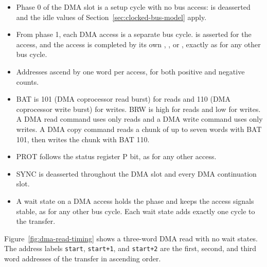 \begin{itemize}
	\item Phase 0 of the DMA slot is a setup cycle with no bus access:  is deasserted and the idle values of
	      Section~\ref{sec:clocked-bus-model} apply.
	\item From phase 1, each DMA access is a separate bus cycle.  is asserted for the access, and the access is
	      completed by its own , , or , exactly as for any other bus cycle.
	\item Addresses ascend by one word per access, for both positive and negative counts.
	\item BAT is 101 (DMA coprocessor read burst) for reads and 110 (DMA coprocessor write burst) for writes. BRW is high for
	      reads and low for writes. A DMA read command uses only reads and a DMA write command uses only writes. A DMA copy
	      command reads a chunk of up to seven words with BAT 101, then writes the chunk with BAT 110.
	\item PROT follows the status register P bit, as for any other access.
	\item SYNC is deasserted throughout the DMA slot and every DMA continuation slot.
	\item A wait state on a DMA access holds the phase and keeps the access signals stable, as for any other bus cycle. Each wait
	      state adds exactly one cycle to the transfer.
\end{itemize}

Figure~\ref{fig:dma-read-timing} shows a three-word DMA read with no wait states. The address labels \texttt{start},
\texttt{start+1}, and \texttt{start+2} are the first, second, and third word addresses of the transfer in ascending
order.

